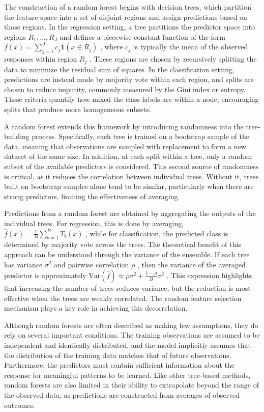 \documentclass[
  11pt,
  letterpaper,
]{article}
\begin{document}
The construction of a random forest begins with decision trees, which
partition the feature space into a set of disjoint regions and assign
predictions based on those regions. In the regression setting, a tree
partitions the predictor space into regions \(R_1, \dots, R_J\) and
defines a piecewise constant function of the form
\(\hat{f}(x) = \sum_{j=1}^{J} c_j \mathbf{1}(x \in R_j)\) , where
\(c_j\) is typically the mean of the observed responses within region
\(R_j\) . These regions are chosen by recursively splitting the data to
minimize the residual sum of squares. In the classification setting,
predictions are instead made by majority vote within each region, and
splits are chosen to reduce impurity, commonly measured by the Gini
index or entropy. These criteria quantify how mixed the class labels are
within a node, encouraging splits that produce more homogeneous subsets.

A random forest extends this framework by introducing randomness into
the tree-building process. Specifically, each tree is trained on a
bootstrap sample of the data, meaning that observations are sampled with
replacement to form a new dataset of the same size. In addition, at each
split within a tree, only a random subset of the available predictors is
considered. This second source of randomness is critical, as it reduces
the correlation between individual trees. Without it, trees built on
bootstrap samples alone tend to be similar, particularly when there are
strong predictors, limiting the effectiveness of averaging.

Predictions from a random forest are obtained by aggregating the outputs
of the individual trees. For regression, this is done by averaging,
\(\hat{f}(x) = \frac{1}{B} \sum_{b=1}^{B} T_b(x)\) , while for
classification, the predicted class is determined by majority vote
across the trees. The theoretical benefit of this approach can be
understood through the variance of the ensemble. If each tree has
variance \(\sigma^2\) and pairwise correlation \(\rho\) , then the
variance of the averaged predictor is approximately
\(\text{Var}(\hat{f}) \approx \rho \sigma^2 + \frac{1 - \rho}{B} \sigma^2\)
. This expression highlights that increasing the number of trees reduces
variance, but the reduction is most effective when the trees are weakly
correlated. The random feature selection mechanism plays a key role in
achieving this decorrelation.

Although random forests are often described as making few assumptions,
they do rely on several important conditions. The training observations
are assumed to be independent and identically distributed, and the model
implicitly assumes that the distribution of the training data matches
that of future observations. Furthermore, the predictors must contain
sufficient information about the response for meaningful patterns to be
learned. Like other tree-based methods, random forests are also limited
in their ability to extrapolate beyond the range of the observed data,
as predictions are constructed from averages of observed outcomes.
\end{document}
